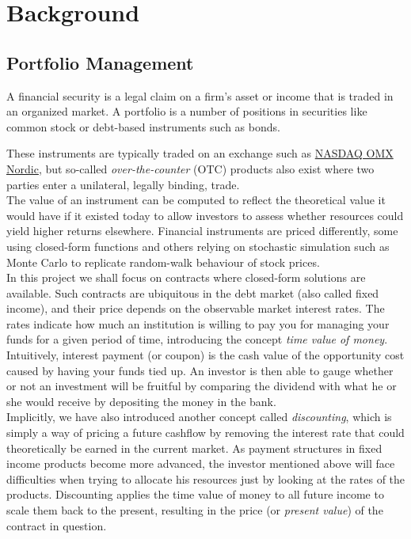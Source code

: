 \chapter{Background}

\section{Portfolio Management}

A financial security is a legal claim on a firm's asset or income 
that is traded in an organized market\cite{alexander2008market}.
A portfolio is a number of positions in securities like common
stock or debt-based instruments such as bonds.

These instruments are typically traded on an exchange such as 
\href{http://www.nasdaqomxnordic.com/}{NASDAQ OMX Nordic}, but so-called
\emph{over-the-counter} (OTC) products also exist where two parties enter
a unilateral, legally binding, trade.\\
The value of an instrument can be computed to reflect the theoretical 
value it would have if it existed today to allow investors to assess
whether resources could yield higher returns elsewhere. Financial 
instruments are priced differently, some using closed-form functions
and others relying on stochastic simulation such as Monte Carlo to replicate 
random-walk behaviour of stock prices\cite{HULL}.\\

In this project we shall focus on contracts where closed-form solutions are
available. Such contracts are ubiquitous in the debt market (also called fixed
income), and their price depends on the observable market interest
rates. The rates indicate how much an institution is willing to pay you for
managing your funds for a given period of time, introducing the concept
\emph{time value of money}. Intuitively, interest payment (or coupon) is
the cash value of the opportunity cost caused by having your funds tied up.
An investor is then able to gauge whether or not an investment will be
fruitful by comparing the dividend with what he or she would receive by 
depositing the money in the bank.\\

Implicitly, we have also introduced another concept called \emph{discounting},
which is simply a way of pricing a future cashflow by removing the interest
rate that could theoretically be earned in the current market. As payment structures
in fixed income products become more advanced, the investor mentioned above will 
face difficulties when trying to allocate his resources just by looking at the
rates of the products. Discounting applies the time value of money to all
future income to scale them back to the present, resulting in the price (or
\emph{present value}) of the contract in question.\\

